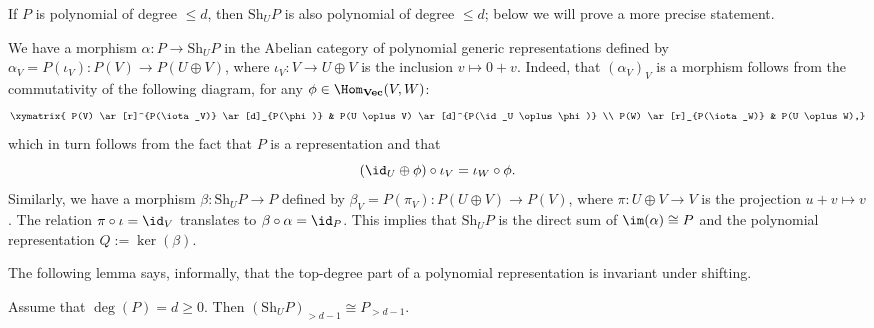 \documentclass{amsart}
\renewcommand{\Vec}{\mathbf{Vec}}
\newcommand{\Sh}{\mathrm{Sh}}
\begin{document}
If $P$ is polynomial of degree $\leq d$, then $\Sh_U P$ is also polynomial
of degree $\leq d$; below we will prove a more precise statement. 

We have a morphism $\alpha:P \to \Sh_U P$ in the Abelian category of
polynomial generic representations defined by
$\alpha_V=P(\iota_V):P(V) \to P(U \oplus V)$, where $\iota_V:V \to U
\oplus V$ is the inclusion $v \mapsto 0 + v$. Indeed, that
$(\alpha_V)_V$ is a morphism follows 
from the commutativity of the following diagram, for any $\phi \in
\Hom_\Vec(V,W)$:
\[ \xymatrix{
P(V) \ar[r]^{P(\iota_V)} \ar[d]_{P(\phi)} & P(U \oplus V)
\ar[d]^{P(\id_U \oplus \phi)} \\
P(W) \ar[r]_{P(\iota_W)} & P(U \oplus W),} \]
which in turn follows from the fact that $P$ is a
representation and that
\[ (\id_U \oplus \phi) \circ \iota_V = \iota_W \circ \phi. \]
Similarly, we have a morphism
$\beta:\Sh_U P
\to P$ defined by $\beta_V=P(\pi_V):P(U \oplus V) \to P(V)$, where
$\pi:U \oplus V \to V$ is the projection $u+v \mapsto v$. The relation
$\pi \circ \iota=\id_V$ translates to $\beta \circ \alpha=\id_P$. This
implies that $\Sh_U P$ is the direct sum of $\im(\alpha) \cong P$ and
the polynomial representation $Q:=\ker(\beta)$. 

The following lemma says, informally, that the top-degree part of a
polynomial representation is invariant under shifting. 

\begin{lm} \label{lm:ShiftTop}
Assume that $\deg(P)=d \geq 0$. Then $(\Sh_U P)_{>d-1} \cong P_{>d-1}$.
\end{lm}
\end{document}
